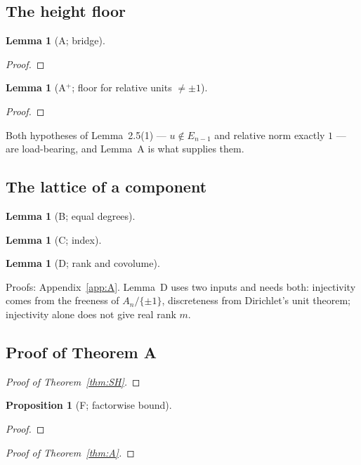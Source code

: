 \documentclass[11pt]{amsart}
\newtheorem{proposition}[theorem]{Proposition}
\newtheorem{lemma}[theorem]{Lemma}
\theoremstyle{remark}\newtheorem{remark}[theorem]{Remark}
\theoremstyle{definition}\newtheorem{definition}[theorem]{Definition}
\theoremstyle{definition}\newtheorem{algorithm}[theorem]{Algorithm}
\providecommand{\proofsdir}{../../proofs} %
\begin{document}
\subsection{The height floor}
\begin{lemma}[A; bridge]\label{lem:A}

\end{lemma}
\begin{proof}

\end{proof}
\begin{lemma}[A$^+$; floor for relative units $\ne\pm1$]\label{lem:Aplus}

\end{lemma}
\begin{proof}

\end{proof}
Both hypotheses of \cite{MO16} Lemma~2.5(1) --- $u\notin E_{n-1}$ and relative norm exactly $1$ --- are load-bearing, and Lemma~A is what supplies them.

\subsection{The lattice of a component}
\begin{lemma}[B; equal degrees]\label{lem:B}

\end{lemma}
\begin{lemma}[C; index]\label{lem:C}

\end{lemma}
\begin{lemma}[D; rank and covolume]\label{lem:D}

\end{lemma}
Proofs: Appendix~\ref{app:A}. Lemma~D uses two inputs and needs both: injectivity comes from the freeness of $A_n/\{\pm1\}$, discreteness from Dirichlet's unit theorem; injectivity alone does not give real rank $m$.

\subsection{Proof of Theorem A}\label{sec:proofA}
\begin{proof}[Proof of Theorem~\ref{thm:SH}]

\end{proof}
\begin{proposition}[F; factorwise bound]\label{prop:F}

\end{proposition}
\begin{proof}

\end{proof}
\begin{proof}[Proof of Theorem~\ref{thm:A}]

\end{proof}
\end{document}
